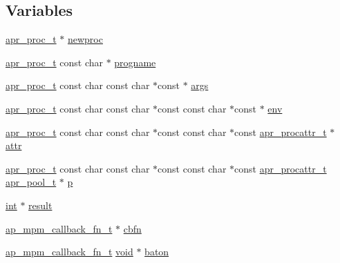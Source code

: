 \subsection*{Variables}
\begin{DoxyCompactItemize}
\item 
\hyperlink{structapr__proc__t}{apr\+\_\+proc\+\_\+t} $\ast$ \hyperlink{group__APACHE__CORE__MPM_ga8fcead6a09878f3797cd4eed89245aa6}{newproc}
\item 
\hyperlink{structapr__proc__t}{apr\+\_\+proc\+\_\+t} const char $\ast$ \hyperlink{group__APACHE__CORE__MPM_ga754795253280be76a58e8b21fbac11dc}{progname}
\item 
\hyperlink{structapr__proc__t}{apr\+\_\+proc\+\_\+t} const char const char $\ast$const $\ast$ \hyperlink{group__APACHE__CORE__MPM_gaa72bdc340ae9df68cd6f4afa28f1fd81}{args}
\item 
\hyperlink{structapr__proc__t}{apr\+\_\+proc\+\_\+t} const char const char $\ast$const const char $\ast$const $\ast$ \hyperlink{group__APACHE__CORE__MPM_ga050c00b1a538603bac07d58e6e1c4ec7}{env}
\item 
\hyperlink{structapr__proc__t}{apr\+\_\+proc\+\_\+t} const char const char $\ast$const const char $\ast$const \hyperlink{structapr__procattr__t}{apr\+\_\+procattr\+\_\+t} $\ast$ \hyperlink{group__APACHE__CORE__MPM_ga00d7b614621096a3637da8a7387f6476}{attr}
\item 
\hyperlink{structapr__proc__t}{apr\+\_\+proc\+\_\+t} const char const char $\ast$const const char $\ast$const \hyperlink{structapr__procattr__t}{apr\+\_\+procattr\+\_\+t} \hyperlink{structapr__pool__t}{apr\+\_\+pool\+\_\+t} $\ast$ \hyperlink{group__APACHE__CORE__MPM_ga5cd91701e5c167f2b1a38e70ab57817e}{p}
\item 
\hyperlink{pcre_8txt_a42dfa4ff673c82d8efe7144098fbc198}{int} $\ast$ \hyperlink{group__APACHE__CORE__MPM_ga9f5959dd76d5c83e775dcf44de684686}{result}
\item 
\hyperlink{group__APACHE__CORE__MPM_ga0ca31a834a87abfb20d959041aa57de0}{ap\+\_\+mpm\+\_\+callback\+\_\+fn\+\_\+t} $\ast$ \hyperlink{group__APACHE__CORE__MPM_gabed6214c355f45b7a873a7db118e1dc9}{cbfn}
\item 
\hyperlink{group__APACHE__CORE__MPM_ga0ca31a834a87abfb20d959041aa57de0}{ap\+\_\+mpm\+\_\+callback\+\_\+fn\+\_\+t} \hyperlink{group__MOD__ISAPI_gacd6cdbf73df3d9eed42fa493d9b621a6}{void} $\ast$ \hyperlink{group__APACHE__CORE__MPM_ga3b2abf82e64753cd3564882d9ad8eb86}{baton}
\end{DoxyCompactItemize}


